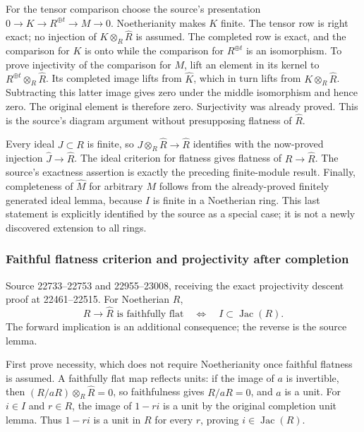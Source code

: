 For the tensor comparison choose the source's presentation \(0\to K\to R^{\oplus t}\to M\to0\). Noetherianity makes \(K\) finite. The tensor row is right exact; no injection of \(K\otimes_R\widehat R\) is assumed. The completed row is exact, and the comparison for \(K\) is onto while the comparison for \(R^{\oplus t}\) is an isomorphism. To prove injectivity of the comparison for \(M\), lift an element in its kernel to \(R^{\oplus t}\otimes_R\widehat R\). Its completed image lifts from \(\widehat K\), which in turn lifts from \(K\otimes_R\widehat R\). Subtracting this latter image gives zero under the middle isomorphism and hence zero. The original element is therefore zero. Surjectivity was already proved. This is the source's diagram argument without presupposing flatness of \(\widehat R\).

Every ideal \(J\subset R\) is finite, so \(J\otimes_R\widehat R\to\widehat R\) identifies with the now-proved injection \(\widehat J\to\widehat R\). The ideal criterion for flatness gives flatness of \(R\to\widehat R\). The source's exactness assertion is exactly the preceding finite-module result. Finally, completeness of \(\widehat M\) for arbitrary \(M\) follows from the already-proved finitely generated ideal lemma, because \(I\) is finite in a Noetherian ring. This last statement is explicitly identified by the source as a special case; it is not a newly discovered extension to all rings.

\subsubsection{Faithful flatness criterion and projectivity after completion}\label{faithful-flatness-criterion-and-projectivity-after-completion}

Source 22733--22753 and 22955--23008, receiving the exact projectivity descent proof at 22461--22515. For Noetherian \(R\), \[
R\longrightarrow\widehat R\text{ is faithfully flat}
\quad\Longleftrightarrow\quad I\subset\operatorname{Jac}(R).
\] The forward implication is an additional consequence; the reverse is the source lemma.

First prove necessity, which does not require Noetherianity once faithful flatness is assumed. A faithfully flat map reflects units: if the image of \(a\) is invertible, then \((R/aR)\otimes_R\widehat R=0\), so faithfulness gives \(R/aR=0\), and \(a\) is a unit. For \(i\in I\) and \(r\in R\), the image of \(1-ri\) is a unit by the original completion unit lemma. Thus \(1-ri\) is a unit in \(R\) for every \(r\), proving \(i\in\operatorname{Jac}(R)\).

